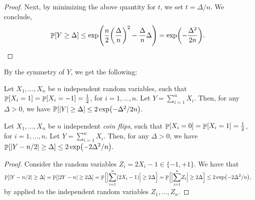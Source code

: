 \begin{proof}
    Next, by minimizing the above quantity for $t$, we set $t =
    \Delta/n$. We conclude,
    \begin{align*}
        \Prob{ Y \geq \Delta } \leq \exp
        \pth{\frac{n}{2}\pth{\frac{\Delta}{n}}^2 -
           \frac{\Delta}{n}\Delta} = \exp \pth{- \frac{\Delta^2}{2n}}.
    \end{align*}
\end{proof}

By the symmetry of $Y$, we get the following:
\begin{corollary}
    Let $X_1, \ldots, X_n$ be $n$ independent random variables, such
    that $\Prob{X_i =1} =\Prob{X_i=-1} = \frac{1}{2}$, for
    $i=1,\ldots, n$. Let $Y = \sum_{i=1}^n X_i$. Then, for any $\Delta
    >0$, we have
    \begin{math}
        \ProbLTR[ \cardin{Y} \geq \Delta ] \leq
        2\exp\pth{-\Delta^2/2n}.
    \end{math}
\end{corollary}

\begin{fragment}{}
\begin{corollary}
    Let $X_1, \ldots, X_n$ be $n$ independent \emph{coin flips}, such
    that $\Prob{X_i =0} =\Prob{X_i=1} = \frac{1}{2}$, for $i=1,\ldots,
    n$. Let $Y = \sum_{i=1}^n X_i$. Then, for any $\Delta >0$, we have
    \begin{math}
        \Prob{\cardin{Y - {n}/{2}} \geq \Delta }%
        \leq%
        2\exp \pth{-2\Delta^2/n}.
  \end{math}
\end{corollary}
\end{fragment}
\begin{proof}
    Consider the random variables $Z_i = 2X_i -1 \in \{-1, +1\}$. We
    have that
    \begin{equation*}
        \Prob{\cardin{Y - {n}/{2}} \geq \Delta }
        =%
        \Prob{\cardin{2Y - {n}} \geq 2\Delta }
        =
        \Prob{\cardin{\Bigl.\smash{\sum_{i=1}^n} (2X_i - 1)} \geq 2\Delta }
        =
        \Prob{\cardin{\Bigl.\smash{\sum_{i=1}^n} Z_i} \geq 2\Delta }
        \leq
        2\exp \pth{-2\Delta^2/n},
    \end{equation*}
    by  applied to the independent random
    variables $Z_1, \ldots, Z_n$.
\end{proof}


